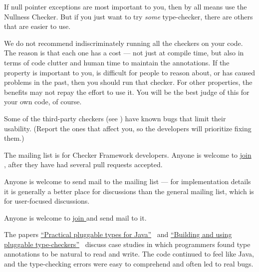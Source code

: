 If null pointer exceptions are most important to you, then by all means use
the Nullness Checker.  But if you just want to try \emph{some}
type-checker, there are others that are easier to use.

We do not recommend indiscriminately running all the checkers on your code.
The reason is that each one has a cost --- not just at compile time, but
also in terms of code clutter and human time to maintain the annotations.
If the property is important to you, is difficult for people to reason
about, or has caused problems in the past, then you should run that
checker.  For other properties, the benefits may not repay the effort to
use it.  You will be the best judge of this for your own code, of course.

Some of the third-party checkers (see
)
have known bugs that limit their
usability.  (Report the ones that affect you, so the developers
will prioritize fixing them.)



The  mailing list is for
Checker Framework developers.  Anyone is welcome to
\href{https://groups.google.com/forum/#!forum/checker-framework-dev}{join
  }, after they have had several pull requests
accepted.

Anyone is welcome to send mail to the
 mailing list --- for
implementation details it is generally a better place for discussions than
the general  mailing list,
which is for user-focused discussions.

Anyone is welcome to
\href{https://groups.google.com/forum/#!forum/checker-framework-discuss}{join
  } and send mail to it.





The papers
\href{https://homes.cs.washington.edu/~mernst/pubs/pluggable-checkers-issta2008-abstract.html}{``Practical
  pluggable types for Java''}~\cite{PapiACPE2008}
and
\href{https://homes.cs.washington.edu/~mernst/pubs/pluggable-checkers-icse2011-abstract.html}{``Building
  and using pluggable type-checkers''}~\cite{DietlDEMS2011}
discuss case studies in
which programmers
found type annotations to be natural to read and write.  The code
continued to feel like Java, and the type-checking errors were easy to
comprehend and often led to real bugs.

